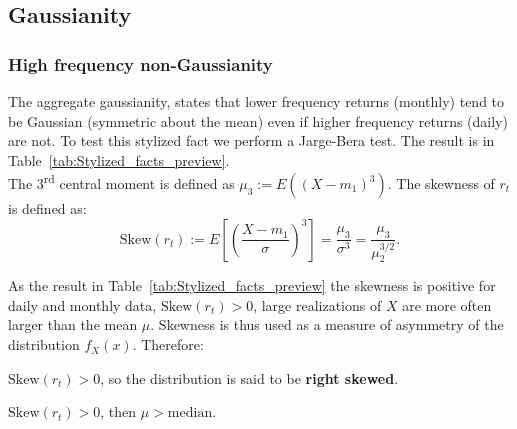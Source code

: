 \documentclass{article}
\begin{document}
\subsection{Gaussianity}
\subsubsection{High frequency non-Gaussianity}

The aggregate gaussianity, states that lower frequency returns (monthly) tend to be Gaussian (symmetric about the mean) even if higher frequency returns (daily) are not. 
To test this stylized fact we perform a Jarge-Bera test. The result is in Table~\ref{tab:Stylized_facts_preview}. \\

\noindent The 3\textsuperscript{rd} central moment is defined as
$\mu_3 := E((X - m_1)^3).$ The skewness of \( r_t \) is defined as:
\[
\text{Skew}(r_t) := E \left[ \left( \frac{X - m_1}{\sigma} \right)^3 \right] = \frac{\mu_3}{\sigma^3} = \frac{\mu_3}{\mu_2^{3/2}}.
\]

\noindent As the result in Table~\ref{tab:Stylized_facts_preview} 
the skewness is positive for daily and monthly data, \( \text{Skew}(r_t) >0 \), large realizations of \( X \) are more often larger
than the mean \( \mu \). 
Skewness is thus used as a measure of asymmetry of the distribution \( f_X(x) \). Therefore:
 
\( \text{Skew}(r_t) > 0 \), so the distribution is said to be \textbf{right skewed}. 

\( \text{Skew}(r_t) > 0 \), then \( \mu > \text{median} \).
\end{document}

